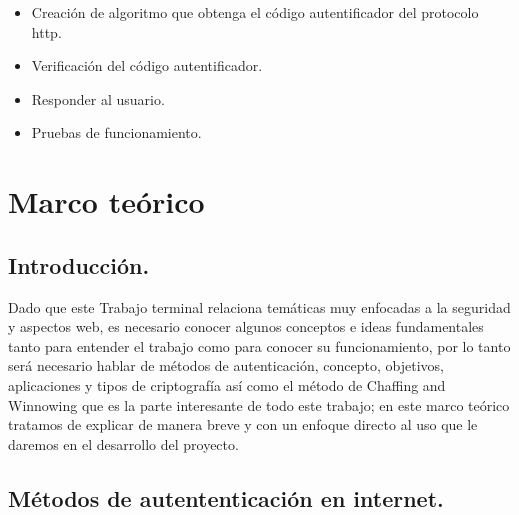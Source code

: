 \documentclass[12pt, a4paper, titlepage]{report}
\begin{document}
\begin{enumerate}
\begin{itemize}
                \begin{itemize}
                    \item Creación de algoritmo que obtenga el código autentificador del protocolo \acrshort{http}.
                    \item Verificación del código autentificador.
                    \item Responder al usuario.
                    \item Pruebas de funcionamiento.
                \end{itemize}
            \end{itemize}
        \end{enumerate}
	
	\chapter{\textcolor{azulescom}{Marco teórico}}
	    
	    \section{Introducci\'on.}
	        Dado que este Trabajo terminal relaciona tem\'aticas muy enfocadas a la seguridad y aspectos web, es necesario conocer algunos conceptos e ideas fundamentales tanto para entender el trabajo como para conocer su funcionamiento, por lo tanto será necesario hablar de m\'etodos de autenticación, concepto, objetivos, aplicaciones y tipos de criptografía así como el método de Chaffing and Winnowing que es la parte interesante de todo este trabajo; en este marco teórico tratamos de explicar de manera breve y con un enfoque directo al uso que le daremos en el desarrollo del proyecto.
	    \section{Métodos de autententicación en internet.}
\end{document}
